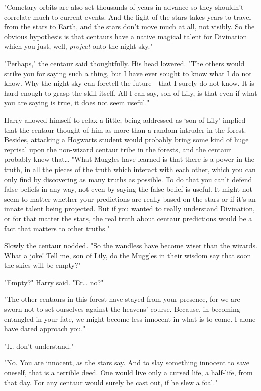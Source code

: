"Cometary orbits are also set thousands of years in advance so they shouldn't 
correlate much to current events. And the light of the stars takes years to 
travel from the stars to Earth, and the stars don't move much at all, not 
visibly. So the obvious hypothesis is that centaurs have a native magical 
talent for Divination which you just, well, \emph{project} onto the night sky."

"Perhaps," the centaur said thoughtfully. His head lowered. "The others would 
strike you for saying such a thing, but I have ever sought to know what I do 
not know. Why the night sky can foretell the future---that I surely do not 
know. It is hard enough to grasp the skill itself. All I can say, son of Lily, 
is that even if what you are saying is true, it does not seem useful."

Harry allowed himself to relax a little; being addressed as `son of Lily' 
implied that the centaur thought of him as more than a random intruder in the 
forest. Besides, attacking a Hogwarts student would probably bring some kind of 
huge reprisal upon the non-wizard centaur tribe in the forests, and the centaur 
probably knew that{\ldots} "What Muggles have learned is that there is a power 
in the truth, in all the pieces of the truth which interact with each other, 
which you can only find by discovering as many truths as possible. To do that 
you can't defend false beliefs in any way, not even by saying the false belief 
is useful. It might not seem to matter whether your predictions are really 
based on the stars or if it's an innate talent being projected. But if you 
wanted to really understand Divination, or for that matter the stars, the real 
truth about centaur predictions would be a fact that matters to other truths."

Slowly the centaur nodded. "So the wandless have become wiser than the wizards. 
What a joke! Tell me, son of Lily, do the Muggles in their wisdom say that soon 
the skies will be empty?"

"Empty?" Harry said. "Er{\ldots} no?"

"The other centaurs in this forest have stayed from your presence, for we are 
sworn not to set ourselves against the heavens' course. Because, in becoming 
entangled in your fate, we might become less innocent in what is to come. I 
alone have dared approach you."

"I{\ldots} don't understand."

"No. You are innocent, as the stars say. And to slay something innocent to save 
oneself, that is a terrible deed. One would live only a cursed life, a 
half-life, from that day. For any centaur would surely be cast out, if he slew 
a foal."

